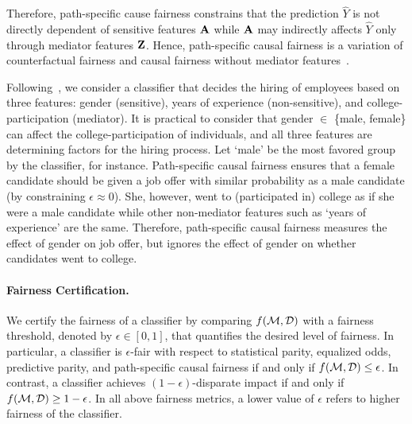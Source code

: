 Therefore, path-specific cause fairness constrains that the prediction $ \hat{Y} $ is not directly dependent of sensitive features $ \mathbf{A} $ while $ \mathbf{A} $ may indirectly affects $ \hat{Y} $ only through mediator features $ \mathbf{Z} $. Hence, path-specific causal fairness is a variation of counterfactual fairness and causal fairness without mediator features~\cite{bastani2019probabilistic}. 




\begin{example}
	Following~\cite{bastani2019probabilistic}, we consider a classifier that decides the hiring of employees based on three features: gender (sensitive), years of experience (non-sensitive), and college-participation (mediator). It is practical to consider that gender $ \in $ \{male, female\} can affect the college-participation of individuals, and all three features are determining factors for the hiring process. Let `male' be the most favored group by the classifier, for instance. Path-specific causal fairness ensures that a female candidate should be given a job offer with similar probability as a male candidate (by constraining $ \epsilon \approx 0 $). She,  however,  went to (participated in) college as if she were a male candidate while other non-mediator features such as  `years of experience' are the same.  Therefore, path-specific causal fairness measures the effect of gender on job offer, but ignores the effect of gender on whether candidates went to college.
\end{example}	



\paragraph{Fairness Certification.} We certify the fairness of a classifier by comparing $ f(\mathcal{M}, \mathcal{D}) $ with a fairness threshold, denoted by $ \epsilon \in [0,1] $, that quantifies the desired level of fairness. In particular, a classifier is $ \epsilon $-fair with respect to statistical parity, equalized odds, predictive parity, and path-specific causal fairness if and only if $ f(\mathcal{M}, \mathcal{D}) \le \epsilon $. In contrast, a classifier achieves $(1 - \epsilon)$-disparate impact  if and only if $ f(\mathcal{M}, \mathcal{D}) \ge 1 - \epsilon $. In all above fairness metrics, a lower value of $ \epsilon $ refers to higher fairness of the classifier.



